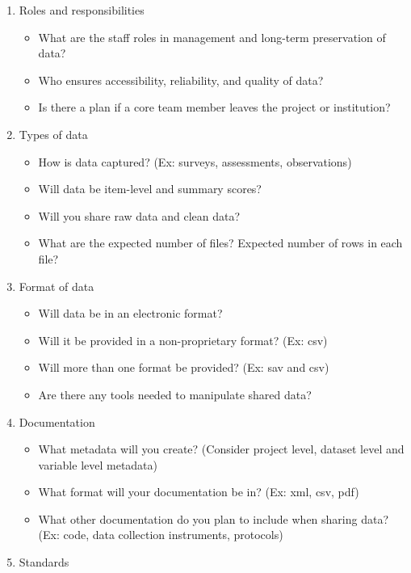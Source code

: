 \documentclass[
]{book}
\providecommand{\tightlist}{%
  \setlength{\itemsep}{0pt}\setlength{\parskip}{0pt}}
\begin{document}
\begin{enumerate}
\def\labelenumi{\arabic{enumi}.}
\tightlist
\item
  Roles and responsibilities

  \begin{itemize}
  \tightlist
  \item
    What are the staff roles in management and long-term preservation of data?
  \item
    Who ensures accessibility, reliability, and quality of data?
  \item
    Is there a plan if a core team member leaves the project or institution?
  \end{itemize}
\item
  Types of data

  \begin{itemize}
  \tightlist
  \item
    How is data captured? (Ex: surveys, assessments, observations)
  \item
    Will data be item-level and summary scores?
  \item
    Will you share raw data and clean data?
  \item
    What are the expected number of files? Expected number of rows in each file?
  \end{itemize}
\item
  Format of data

  \begin{itemize}
  \tightlist
  \item
    Will data be in an electronic format?
  \item
    Will it be provided in a non-proprietary format? (Ex: csv)
  \item
    Will more than one format be provided? (Ex: sav and csv)
  \item
    Are there any tools needed to manipulate shared data?
  \end{itemize}
\item
  Documentation

  \begin{itemize}
  \tightlist
  \item
    What metadata will you create? (Consider project level, dataset level and variable level metadata)
  \item
    What format will your documentation be in? (Ex: xml, csv, pdf)
  \item
    What other documentation do you plan to include when sharing data? (Ex: code, data collection instruments, protocols)
  \end{itemize}
\item
  Standards


\end{enumerate}
\end{document}
